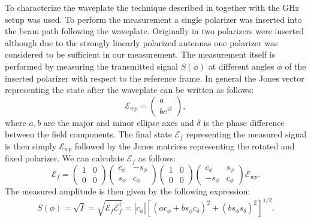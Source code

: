 To characterize the waveplate the technique described in \cite{Masson2006} together with the GHz setup was used. To perform the measurement a single polarizer was inserted into the beam path following the waveplate. Originally in \cite{Masson2006} two polarizers were inserted although due to the strongly linearly polarized antennas one polarizer was considered to be sufficient in our measurement. The measurement itself is performed by measuring the transmitted signal $S(\phi)$ at different angles $\phi$ of the inserted polarizer with respect to the reference frame. In general the Jones vector representing the state after the waveplate can be written as follows:
\begin{equation}
    \bm{\mathcal{E}}_{wp}= 
    \begin{pmatrix}
    a \\
    be^{i\delta}
    \end{pmatrix},
\end{equation}
where $a,b$ are the major and minor ellipse axes and $\delta$ is the phase difference between the field components. The final state $\bm{\mathcal{E}}_{f}$ representing the measured signal is then simply $\bm{\mathcal{E}}_{wp}$ followed by the Jones matrices representing the rotated and fixed polarizer. We can calculate $\bm{\mathcal{E}}_{f}$ as follows:
\begin{equation}
    \bm{\mathcal{E}}_{f}= 
    \begin{pmatrix}
        1 & 0\\
        0 & 0
    \end{pmatrix}
    \begin{pmatrix}
        c_{\phi} & -s_{\phi}\\
        s_{\phi} & c_{\phi}
    \end{pmatrix}
    \begin{pmatrix}
        1 & 0\\
        0 & 0
    \end{pmatrix}
    \begin{pmatrix}
        c_{\phi} & s_{\phi}\\
        -s_{\phi} & c_{\phi}
    \end{pmatrix}
    \bm{\mathcal{E}}_{wp}.
\end{equation}
The measured amplitude is then given by the following expression:
\begin{equation}
    S(\phi)=\sqrt{I} = \sqrt{\bm{\mathcal{E}}_{f} \bm{\mathcal{E}}_{f}^{\dagger}} = |c_{\phi}|\left[(ac_{\phi}+bs_{\phi}c_{\delta})^2 + (bs_{\phi}s_{\delta})^2\right]^{1/2}.
    \label{eq:ampl_fit_func}
\end{equation}

